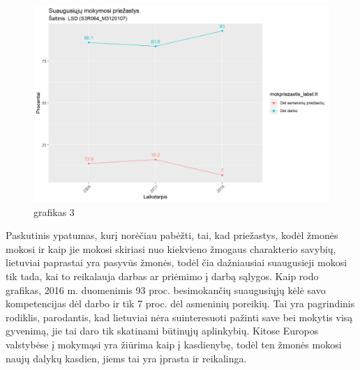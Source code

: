 \documentclass[12pt,a4paper, titlepage]{article}
\begin{document}
\paragraph{}	 

\begin{figure}[H]
\center
\includegraphics[scale=0.75]{Suaugusiuju_mokymosi_priezastys}
\caption{grafikas 3}
\end{figure}

	   Paskutinis ypatumas, kurį norėčiau pabėžti, tai, kad priežastys, kodėl žmonės mokosi ir kaip jie mokosi skiriasi nuo kiekvieno žmogaus charakterio savybių, lietuviai paprastai yra pasyvūs žmonės, todėl čia dažniausiai suaugusieji mokosi tik tada, kai to reikalauja darbas ar priėmimo į darbą sąlygos. Kaip rodo grafikas, 2016 m. duomenimis 93 proc. besimokančių suaugusiųjų kėlė savo kompetencijas dėl darbo ir tik 7 proc. dėl asmeninių poreikių. Tai yra pagrindinis rodiklis, parodantis, kad lietuviai nėra suinteresuoti pažinti save bei mokytis visą gyvenimą, jie tai daro tik skatinami būtinųjų aplinkybių. Kitose Europos valstybėse į mokymąsi yra žiūrima kaip į kasdienybę, todėl ten žmonės mokosi naujų dalykų kasdien, jiems tai yra įprasta ir reikalinga. 
\end{document}
